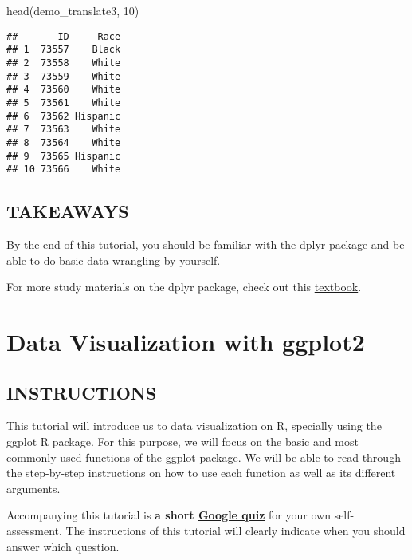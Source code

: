 \documentclass[
]{book}
\newenvironment{Shaded}{\begin{snugshade}}{\end{snugshade}}
\newcommand{\DecValTok}[1]{\textcolor[rgb]{0.00,0.00,0.81}{#1}}
\newcommand{\FunctionTok}[1]{\textcolor[rgb]{0.00,0.00,0.00}{#1}}
\newcommand{\NormalTok}[1]{#1}
\begin{document}
\begin{Shaded}
\begin{Highlighting}[]
\FunctionTok{head}\NormalTok{(demo\_translate3, }\DecValTok{10}\NormalTok{)}
\end{Highlighting}
\end{Shaded}

\begin{verbatim}
##       ID     Race
## 1  73557    Black
## 2  73558    White
## 3  73559    White
## 4  73560    White
## 5  73561    White
## 6  73562 Hispanic
## 7  73563    White
## 8  73564    White
## 9  73565 Hispanic
## 10 73566    White
\end{verbatim}

\hypertarget{takeaways-2}{%
\section{TAKEAWAYS}\label{takeaways-2}}

By the end of this tutorial, you should be familiar with the dplyr package and be able to do basic data wrangling by yourself.

For more study materials on the dplyr package, check out this \href{https://learning.oreilly.com/library/view/r-for-data/9781491910382/ch03.html\#transform}{textbook}.

\hypertarget{data-visualization-with-ggplot2}{%
\chapter{Data Visualization with ggplot2}\label{data-visualization-with-ggplot2}}

\hypertarget{instructions-5}{%
\section{INSTRUCTIONS}\label{instructions-5}}

This tutorial will introduce us to data visualization on R, specially using the ggplot R package. For this purpose, we will focus on the basic and most commonly used functions of the ggplot package. We will be able to read through the step-by-step instructions on how to use each function as well as its different arguments.

Accompanying this tutorial is \textbf{a short \href{https://forms.gle/yUvW9Sg8mqEozyYu8}{Google quiz}} for your own self-assessment. The instructions of this tutorial will clearly indicate when you should answer which question.
\end{document}
